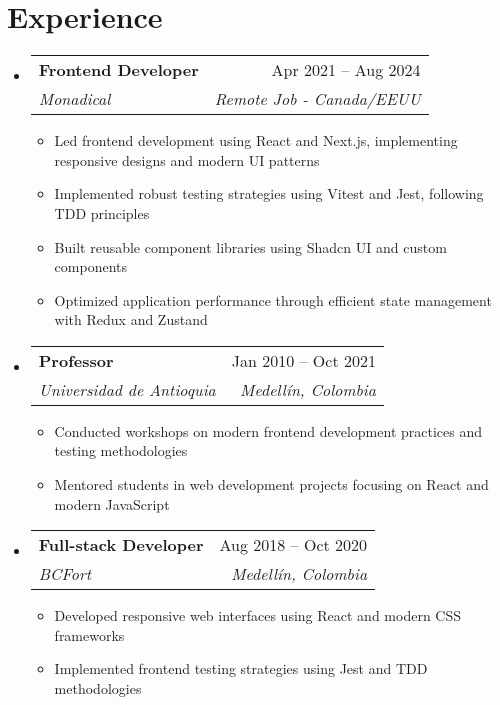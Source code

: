 \documentclass[letterpaper,11pt]{article}
\makeatletter
\newcommand{\resumeSubheading}[4]{
  \vspace{-2pt}
  \item[]
  \begin{tabular*}{\textwidth}{@{\extracolsep{\fill}}l r}
    \textbf{#1} & #2 \\
    \textit{#3} & \textit{#4} \\
  \end{tabular*}
  \vspace{-5pt}
}
\makeatother
\begin{document}
\section{Experience}
\begin{itemize}[leftmargin=0pt, itemindent=0pt, label={}]
\resumeSubheading
{Frontend Developer}{Apr 2021 -- Aug 2024}
{Monadical}{Remote Job - Canada/EEUU}
\begin{itemize}[leftmargin=*]
    \item Led frontend development using React and Next.js, implementing responsive designs and modern UI patterns
    \item Implemented robust testing strategies using Vitest and Jest, following TDD principles
    \item Built reusable component libraries using Shadcn UI and custom components
    \item Optimized application performance through efficient state management with Redux and Zustand
\end{itemize}

\resumeSubheading
{Professor}{Jan 2010 -- Oct 2021}
{Universidad de Antioquia}{Medellín, Colombia}
\begin{itemize}[leftmargin=*]
    \item Conducted workshops on modern frontend development practices and testing methodologies
    \item Mentored students in web development projects focusing on React and modern JavaScript
\end{itemize}

\resumeSubheading
{Full-stack Developer}{Aug 2018 -- Oct 2020}
{BCFort}{Medellín, Colombia}
\begin{itemize}[leftmargin=*]
    \item Developed responsive web interfaces using React and modern CSS frameworks
    \item Implemented frontend testing strategies using Jest and TDD methodologies
\end{itemize}
\end{itemize}
\end{document}
